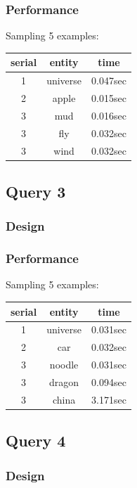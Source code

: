 \documentclass[12pt]{article}
\begin{document}
\subsubsection{Performance}
Sampling 5 examples:
\begin{center}
  \begin{tabular}{ | c | c | c |}
    \hline
    serial & entity & time \\ \hline
    1 & universe & 0.047sec \\ \hline
    2 & apple & 0.015sec \\ \hline
    3 & mud & 0.016sec \\ \hline
    3 & fly & 0.032sec \\ \hline
    3 & wind & 0.032sec \\
    \hline
  \end{tabular}
\end{center}
\subsection{Query 3}
\subsubsection{Design}
\subsubsection{Performance}
Sampling 5 examples:
\begin{center}
  \begin{tabular}{ | c | c | c |}
    \hline
    serial & entity & time \\ \hline
    1 & universe & 0.031sec \\ \hline
    2 & car & 0.032sec \\ \hline
    3 & noodle & 0.031sec \\ \hline
    3 & dragon & 0.094sec \\ \hline
    3 & china & 3.171sec \\
    \hline
  \end{tabular}
\end{center}
\subsection{Query 4}
\subsubsection{Design}
\end{document}
